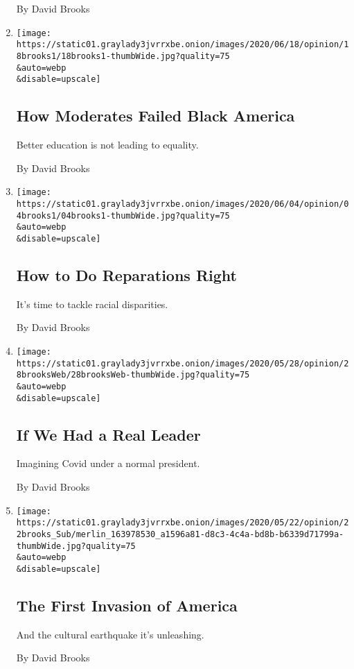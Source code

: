 \begin{enumerate}
  By David Brooks
\item
  \href{/2020/06/18/opinion/black-america-education.html}{}

  \texttt{[image: https://static01.graylady3jvrrxbe.onion/images/2020/06/18/opinion/18brooks1/18brooks1-thumbWide.jpg?quality=75\\\&auto=webp\\\&disable=upscale]}

  \hypertarget{how-moderates-failed-black-america}{%
  \subsection{How Moderates Failed Black
  America}\label{how-moderates-failed-black-america}}

  Better education is not leading to equality.

  By David Brooks
\item
  \href{/2020/06/04/opinion/united-states-reparations.html}{}

  \texttt{[image: https://static01.graylady3jvrrxbe.onion/images/2020/06/04/opinion/04brooks1/04brooks1-thumbWide.jpg?quality=75\\\&auto=webp\\\&disable=upscale]}

  \hypertarget{how-to-do-reparations-right}{%
  \subsection{How to Do Reparations
  Right}\label{how-to-do-reparations-right}}

  It's time to tackle racial disparities.

  By David Brooks
\item
  \href{/2020/05/28/opinion/coronavirus-trump.html}{}

  \texttt{[image: https://static01.graylady3jvrrxbe.onion/images/2020/05/28/opinion/28brooksWeb/28brooksWeb-thumbWide.jpg?quality=75\\\&auto=webp\\\&disable=upscale]}

  \hypertarget{if-we-had-a-real-leader}{%
  \subsection{If We Had a Real Leader}\label{if-we-had-a-real-leader}}

  Imagining Covid under a normal president.

  By David Brooks
\item
  \href{/2020/05/21/opinion/us-coronavirus-history.html}{}

  \texttt{[image: https://static01.graylady3jvrrxbe.onion/images/2020/05/22/opinion/22brooks\_Sub/merlin\_163978530\_a1596a81-d8c3-4c4a-bd8b-b6339d71799a-thumbWide.jpg?quality=75\\\&auto=webp\\\&disable=upscale]}

  \hypertarget{the-first-invasion-of-america}{%
  \subsection{The First Invasion of
  America}\label{the-first-invasion-of-america}}

  And the cultural earthquake it's unleashing.

  By David Brooks
\end{enumerate}


